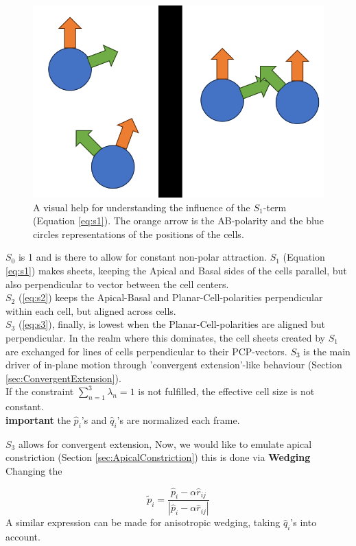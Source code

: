 \begin{figure}[H]
    \centering
    \includegraphics[width=0.3\linewidth]{chapters/Theory/figures/explainS1.png}
    \caption{A visual help for understanding the influence of the $S_1$-term (Equation \ref{eq:s1}). The orange arrow is the AB-polarity and the blue circles representations of the positions of the cells.}
    \label{fig:explain-S1}
\end{figure}

$S_0$ is 1 and is there to allow for constant non-polar attraction.
$S_1$ (Equation \ref{eq:s1}) makes sheets, keeping the Apical and Basal sides of the cells parallel, but also perpendicular to vector between the cell centers. \\
$S_2$ (\ref{eq:s2}) keeps the Apical-Basal and Planar-Cell-polarities perpendicular within each cell, but aligned across cells.\\
$S_3$ (\ref{eq:s3}), finally, is lowest when the Planar-Cell-polarities are aligned but perpendicular. In the realm where this dominates, the cell sheets created by $S_1$ are exchanged for lines of cells perpendicular to their PCP-vectors. $S_3$ is the main driver of in-plane motion through 'convergent extension'-like behaviour  (Section \ref{sec:ConvergentExtension}).\\
If the constraint $\sum_{n=1}^{3}\lambda_n=1$ is not fulfilled, the effective cell size is not constant.\\

\textbf{important} the $\hat{p}_i$'s and $\hat{q}_i$'s are normalized each frame.

$S_3$ allows for convergent extension, Now, we would like to emulate apical constriction (Section \ref{sec:ApicalConstriction}) this is done via \textbf{Wedging}\\

Changing the 

\begin{equation}
    \tilde{{p}}_i = \frac{\hat{p}_i-\alpha \widehat{{r}}_{i j}}{|\hat{p}_i-\alpha \widehat{{r}}_{i j}|} 
\end{equation}
A similar expression can be made for anisotropic wedging, taking  $\hat{q}_i$'s into account.

